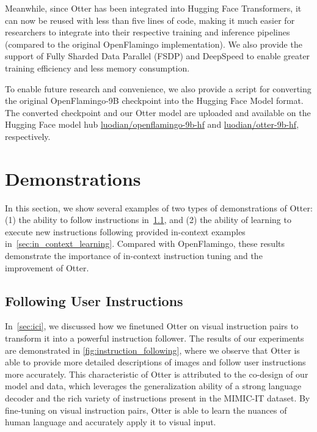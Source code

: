 \documentclass{article}
\begin{document}
Meanwhile, since Otter has been integrated into Hugging Face Transformers, it can now be reused with less than five lines of code, making it much easier for researchers to integrate into their respective training and inference pipelines (compared to the original OpenFlamingo implementation). We also provide the support of Fully Sharded Data Parallel (FSDP) and DeepSpeed to enable greater training efficiency and less memory consumption. 

To enable future research and convenience, we also provide a script for converting the original OpenFlamingo-9B checkpoint into the Hugging Face Model format. The converted checkpoint and our Otter model are uploaded and available on the Hugging Face model hub \url{luodian/openflamingo-9b-hf} and \url{luodian/otter-9b-hf}, respectively.




 \section{Demonstrations}

In this section, we show several examples of two types of demonstrations of Otter: (1) the ability to follow instructions in~\cref{sec:instruction_following}, and (2) the ability of learning to execute new instructions following provided in-context examples in~\cref{sec:in_context_learning}. Compared with OpenFlamingo, these results demonstrate the importance of in-context instruction tuning and the improvement of Otter.

\subsection{Following User Instructions}
\label{sec:instruction_following}

In~\cref{sec:ici}, we discussed how we finetuned Otter on visual instruction pairs to transform it into a powerful instruction follower. The results of our experiments are demonstrated in \cref{fig:instruction_following}, where we observe that Otter is able to provide more detailed descriptions of images and follow user instructions more accurately. This characteristic of Otter is attributed to the co-design of our model and data, which leverages the generalization ability of a strong language decoder and the rich variety of instructions present in the MIMIC-IT dataset. By fine-tuning on visual instruction pairs, Otter is able to learn the nuances of human language and accurately apply it to visual input.
\end{document}
